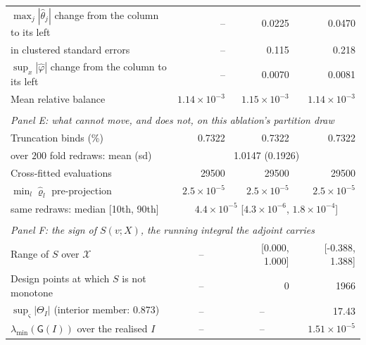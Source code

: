 \begin{tabular}{lrrr}
$\max_j|\hat\theta_j|$ change from the column to its left & -- & 0.0225 & 0.0470 \\
\quad in clustered standard errors & -- & 0.115 & 0.218 \\
$\sup_x|\hat\varphi|$ change from the column to its left & -- & 0.0070 & 0.0081 \\
Mean relative balance & $1.14 \times 10^{-3}$ & $1.15 \times 10^{-3}$ & $1.14 \times 10^{-3}$ \\
\\[0.5em]
\multicolumn{4}{l}{\textit{Panel E: what cannot move, and does not, on this ablation's partition draw}} \\
Truncation binds (\%) & 0.7322 & 0.7322 & 0.7322 \\
\quad over $200$ fold redraws: mean (sd) & \multicolumn{3}{c}{1.0147 (0.1926)} \\
Cross-fitted evaluations & 29500 & 29500 & 29500 \\
$\min_l\hat\varrho_l$ pre-projection & $2.5 \times 10^{-5}$ & $2.5 \times 10^{-5}$ & $2.5 \times 10^{-5}$ \\
\quad same redraws: median [10th, 90th] & \multicolumn{3}{c}{$4.4 \times 10^{-5}$ [$4.3 \times 10^{-6}$, $1.8 \times 10^{-4}$]} \\
\\[0.5em]
\multicolumn{4}{l}{\textit{Panel F: the sign of $S(v;X)$, the running integral the adjoint carries}} \\
Range of $S$ over $\mathcal X$ & \multicolumn{1}{c}{--} & [0.000, 1.000] & [-0.388, 1.388] \\
Design points at which $S$ is not monotone & \multicolumn{1}{c}{--} & 0 & 1966 \\
$\sup_\varsigma|\Theta_I|$ (interior member: 0.873) & \multicolumn{1}{c}{--} & \multicolumn{1}{c}{--} & 17.43 \\
$\lambda_{\min}(\mathsf G(I))$ over the realised $I$ & \multicolumn{1}{c}{--} & \multicolumn{1}{c}{--} & $1.51 \times 10^{-5}$ \\
\bottomrule
\end{tabular}
